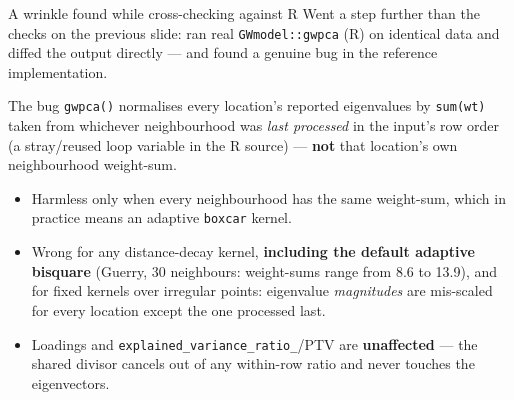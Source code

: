 \documentclass[10pt]{beamer}
\begin{document}
\begin{frame}{A wrinkle found while cross-checking against R}
  Went a step further than the checks on the previous slide: ran real
  \texttt{GWmodel::gwpca} (R) on identical data and diffed the output
  directly --- and found a genuine bug in the reference implementation.
  \begin{block}{The bug}
    \texttt{gwpca()} normalises every location's reported eigenvalues by
    \texttt{sum(wt)} taken from whichever neighbourhood was \emph{last
    processed} in the input's row order (a stray/reused loop variable in the
    R source) --- \textbf{not} that location's own neighbourhood weight-sum.
  \end{block}
  \begin{itemize}
    \item Harmless only when every neighbourhood has the same weight-sum,
      which in practice means an adaptive \texttt{boxcar} kernel.
    \item Wrong for any distance-decay kernel, \textbf{including the default
      adaptive bisquare} (Guerry, 30 neighbours: weight-sums range from 8.6 to
      13.9), and for fixed kernels over irregular points: eigenvalue
      \emph{magnitudes} are mis-scaled for every location except the one
      processed last.
    \item Loadings and \texttt{explained\_variance\_ratio\_}/PTV are
      \textbf{unaffected} --- the shared divisor cancels out of any
      within-row ratio and never touches the eigenvectors.
  \end{itemize}
\end{frame}
\end{document}
